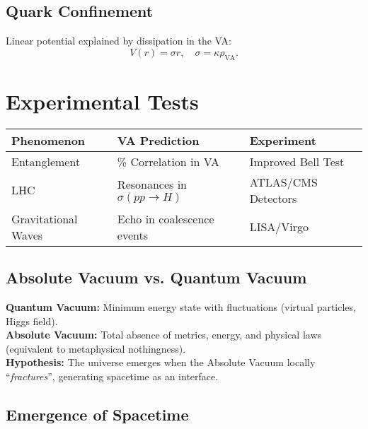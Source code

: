 \documentclass[a4paper]{article}
\theoremstyle{definition}
\theoremstyle{remark}
\numberwithin{equation}{section}
\begin{document}
\subsection{Quark Confinement}

Linear potential explained by dissipation in the VA:\\

\[
V(r) = \sigma r, \quad \sigma = \kappa \rho_{\text{VA}}.
\]

\section{Experimental Tests}
\label{sec:tests}
\renewcommand{\arraystretch}{1.3} %

\begin{table}[h]
	\centering
	\begin{tabular}{
			>{\raggedright\arraybackslash}p{3.5cm}
			>{\raggedright\arraybackslash}p{5cm}
			>{\raggedright\arraybackslash}p{4.5cm}
		}
		\toprule
		\textbf{Phenomenon} & \textbf{VA Prediction} & \textbf{Experiment} \\
		\midrule
		Entanglement & 100\% Correlation in VA & Improved Bell Test \\
		LHC & Resonances in $\sigma(pp \to H)$ & ATLAS/CMS Detectors \\
		Gravitational Waves & Echo in coalescence events & LISA/Virgo \\ 
		\bottomrule 
	\end{tabular} 
\end{table}
	
	
\subsection{Absolute Vacuum vs. Quantum Vacuum}

\textbf{Quantum Vacuum:} Minimum energy state with fluctuations \cite{Rovelli2004} (virtual particles, Higgs field).\\

\textbf{Absolute Vacuum:} Total absence of metrics, energy, and physical laws (equivalent to metaphysical nothingness).\\

\textbf{Hypothesis:} The universe emerges when the Absolute Vacuum locally ``\textit{fractures}'', generating spacetime as an interface.
	
\subsection{Emergence of Spacetime}
\end{document}
